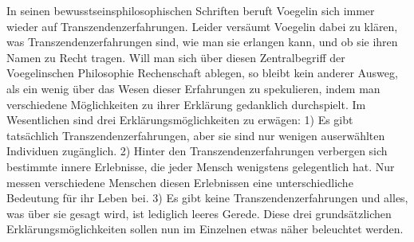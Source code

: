 In seinen bewusstseinsphilosophischen Schriften beruft Voegelin sich immer
wieder auf Transzendenzerfahrungen. Leider versäumt Voegelin dabei zu klären,
was Transzendenzerfahrungen sind, wie man sie erlangen kann, und ob sie ihren
Namen zu Recht tragen. Will man sich über diesen Zentralbegriff der
Voegelinschen Philosophie Rechenschaft ablegen, so bleibt kein anderer Ausweg,
als ein wenig über das Wesen dieser Erfahrungen zu spekulieren, indem man
verschiedene Möglichkeiten zu ihrer Erklärung gedanklich durchspielt. Im
Wesentlichen sind drei Erklärungsmöglichkeiten zu erwägen: 1) Es gibt
tatsächlich Transzendenzerfahrungen, aber sie sind nur wenigen auserwählten
Individuen zugänglich. 2) Hinter den Transzendenzerfahrungen verbergen sich
bestimmte innere Erlebnisse, die jeder Mensch wenigstens gelegentlich hat. Nur
messen verschiedene Menschen diesen Erlebnissen eine unterschiedliche
Bedeutung für ihr Leben bei. 3) Es gibt keine Transzendenzerfahrungen und
alles, was über sie gesagt wird, ist lediglich leeres Gerede. Diese drei
grundsätzlichen Erklärungsmöglichkeiten sollen nun im Einzelnen etwas näher
beleuchtet werden.

